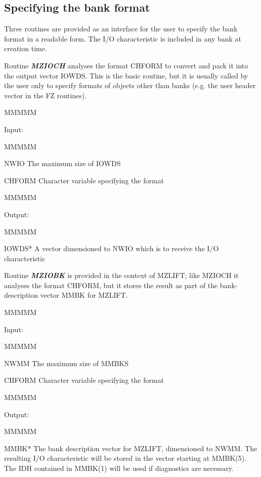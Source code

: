\subsection{Specifying the bank format}
\par Three routines are provided as an interface for the user to
specify the bank format in a readable form.
The I/O characteristic is included in any bank at creation time.
\par Routine {\bf\it MZIOCH} analyses the format CHFORM to convert
and pack it into the output vector IOWDS.
This is the basic routine,
but it is usually called by the user only to specify formats
of objects other than banks
(e.g. the user header vector in the FZ routines).
\begin{DL}{MMMMM}
\item[Input:
]
\begin{DL}{MMMMM}
\item[NWIO
]The maximum size of IOWDS
\item[CHFORM
]Character variable specifying the format
\end{DL}
\end{DL}
\begin{DL}{MMMMM}
\item[Output:
]
\begin{DL}{MMMMM}
\item[IOWDS*
]A vector dimensioned to NWIO which is to receive the I/O characteristic
\end{DL}
\end{DL}
\par Routine {\bf\it MZIOBK} is provided in the context of MZLIFT;
like MZIOCH it analyses the format CHFORM,
but it stores the result as part of the bank-description vector
MMBK for MZLIFT.
\begin{DL}{MMMMM}
\item[Input:
]
\begin{DL}{MMMMM}
\item[NWMM
]The maximum size of MMBKS
\item[CHFORM
]Character variable specifying the format
\end{DL}
\end{DL}
\begin{DL}{MMMMM}
\item[Output:
]
\begin{DL}{MMMMM}
\item[MMBK*
]The bank description vector for MZLIFT, dimensioned to NWMM.
The resulting I/O characteristic will be stored
in the vector starting at MMBK(5).
The IDH contained in MMBK(1) will be used if diagnostics are necessary.
\end{DL}
\end{DL}
